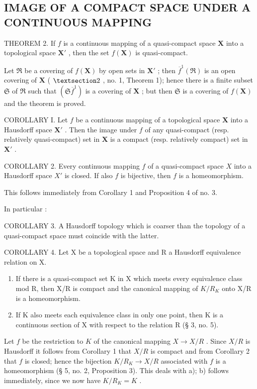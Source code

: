 \subsection{IMAGE OF A COMPACT SPACE UNDER A CONTINUOUS MAPPING}

THEOREM 2. If \(f\) is a continuous mapping of a quasi-compact space \(\mathbf{X}\) into a topological space \(\mathbf{X}'\) , then the set \(f(\mathbf{X})\) is quasi-compact.

Let \(\Re\) be a covering of \(f(\mathbf{X})\) by open sets in \(\mathbf{X}'\) ; then \(\overline{f}^{1}(\Re)\) is an open covering of \(\mathbf{X}\) ( \(\S 2\) , no. 1, Theorem 1); hence there is a finite subset \(\mathfrak{S}\) of \(\Re\) such that \((\mathfrak{S}\overline{f}^{1})\) is a covering of \(\mathbf{X}\) ; but then \(\mathfrak{S}\) is a covering of \(f(\mathbf{X})\) and the theorem is proved.

COROLLARY I. Let \(f\) be a continuous mapping of a topological space \(\mathbf{X}\) into a Hausdorff space \(\mathbf{X}'\) . Then the image under \(f\) of any quasi-compact (resp. relatively quasi-compact) set in \(\mathbf{X}\) is a compact (resp. relatively compact) set in \(\mathbf{X}'\) .

COROLLARY 2. Every continuous mapping \(f\) of a quasi-compact space \(X\) into a Hausdorff space \(X'\) is closed. If also \(f\) is bijective, then \(f\) is a homeomorphism.

This follows immediately from Corollary 1 and Proposition 4 of no. 3.

In particular :

COROLLARY 3. A Hausdorff topology which is coarser than the topology of a quasi-compact space must coincide with the latter.

COROLLARY 4. Let X be a topological space and R a Hausdorff equivalence relation on X.

\begin{enumerate}
\def\labelenumi{\alph{enumi})}
\item
  If there is a quasi-compact set K in X which meets every equivalence class mod R, then X/R is compact and the canonical mapping of \(K/R_{K}\) onto X/R is a homeomorphism.
\item
  If K also meets each equivalence class in only one point, then K is a continuous section of X with respect to the relation R (§ 3, no. 5).
\end{enumerate}

Let \(f\) be the restriction to \(K\) of the canonical mapping \(X \to X / R\) . Since \(X / R\) is Hausdorff it follows from Corollary 1 that \(X / R\) is compact and from Corollary 2 that \(f\) is closed; hence the bijection \(K / R_K \to X / R\) associated with \(f\) is a homeomorphism (§ 5, no. 2, Proposition 3). This deals with a); b) follows immediately, since we now have \(K / R_K = K\) .

